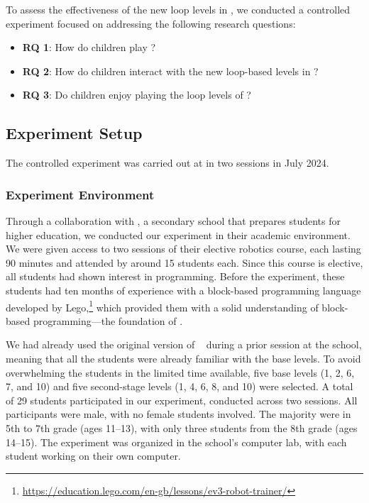 To assess the effectiveness of the new loop levels in \toolname, we conducted a controlled experiment focused on addressing the following research questions:

\begin{itemize}
	\item \textbf{RQ 1}: How do children play \toolname?
	\item \textbf{RQ 2}: How do children interact with the new loop-based levels in \toolname?
	\item \textbf{RQ 3}: Do children enjoy playing the loop levels of \toolname?
\end{itemize}

\subsection{Experiment Setup}

The controlled experiment was carried out at \school in two sessions in July 2024.

\subsubsection{Experiment Environment}

Through a collaboration with \school, a secondary school that prepares students for higher education, we conducted our experiment in their academic environment. We were given access to two sessions of their elective robotics course, each lasting 90 minutes and attended by around 15 students each. Since this course is elective, all students had shown interest in programming. Before the experiment, these students had ten months of experience with a block-based programming language developed by Lego,\footnote{\url{https://education.lego.com/en-gb/lessons/ev3-robot-trainer/}} which provided them with a solid understanding of block-based programming—the foundation of \toolname.

We had already used the original version of \toolname~\cite{DBLP:conf/icst/StraubingerBF24} during a prior session at the school, meaning that all the students were already familiar with the base levels. To avoid overwhelming the students in the limited time available, five base levels (1, 2, 6, 7, and 10) and five second-stage levels (1, 4, 6, 8, and 10) were selected. A total of 29 students participated in our experiment, conducted across two sessions. All participants were male, with no female students involved. The majority were in 5th to 7th grade (ages 11–13), with only three students from the 8th grade (ages 14–15). The experiment was organized in the school's computer lab, with each student working on their own computer.

